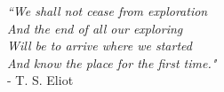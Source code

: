 


\vfill
\begin{flushright}
\emph{``We shall not cease from exploration\\
And the end of all our exploring \\
Will be to arrive where we started \\
And know the place for the first time."\\} 
- T. S.	Eliot
\end{flushright}
\vfill

	





	








